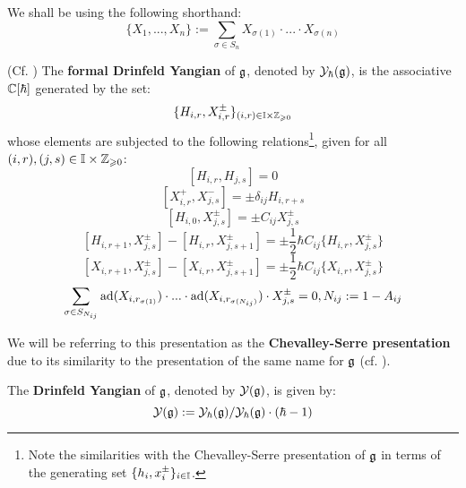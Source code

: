         \begin{convention}
            We shall be using the following shorthand:
                $$\{ X_1, ..., X_n \} := \sum_{\sigma \in S_n} X_{\sigma(1)} \cdot ... \cdot X_{\sigma(n)}$$
        \end{convention}
        \begin{definition} \label{def: formal_drinfeld_yangians}
            (Cf. \cite[Definition 2.1]{guay_nakajima_wendlandt_affine_yangian_coproduct}) The \textbf{formal Drinfeld Yangian} of $\mathfrak{g}$, denoted by $\mathcal{Y}_{\hbar}(\mathfrak{g})$, is the associative $\mathbb{C}[\hbar]$ generated by the set:
                $$\{ H_{i, r}, X_{i, r}^{\pm} \}_{(i, r) \in \simpleroots \x \Z_{\geq 0}}$$
            whose elements are subjected to the following relations\footnote{Note the similarities with the Chevalley-Serre presentation of $\mathfrak{g}$ in terms of the generating set $\{ h_i, x_i^{\pm} \}_{i \in \mathbb{I}}$.}, given for all $(i, r), (j, s) \in \simpleroots \x \Z_{\geq 0}$:
                $$[ H_{i, r}, H_{j, s} ] = 0$$
                $$[ X_{i, r}^+, X_{j, s}^- ] = \pm \delta_{ij} H_{i, r + s}$$
                $$[ H_{i, 0}, X_{j, s}^{\pm} ] = \pm C_{ij} X_{j, s}^{\pm}$$
                $$[ H_{i, r + 1}, X_{j, s}^{\pm} ] - [ H_{i, r}, X_{j, s + 1}^{\pm} ] = \pm \frac12 \hbar C_{ij} \{H_{i, r}, X_{j, s}^{\pm}\}$$
                $$[ X_{i, r + 1}, X_{j, s}^{\pm} ] - [ X_{i, r}, X_{j, s + 1}^{\pm} ] = \pm \frac12 \hbar C_{ij} \{X_{i, r}, X_{j, s}^{\pm}\}$$
                $$\sum_{\sigma \in S_{N_{ij}}} \mathrm{ad}(X_{i, r_{\sigma(1)}}) \cdot ... \cdot \mathrm{ad}(X_{i, r_{\sigma(N_{ij})}}) \cdot X_{j, s}^{\pm} = 0, N_{ij} := 1 - A_{ij}$$
                
            We will be referring to this presentation as the \textbf{Chevalley-Serre presentation} due to its similarity to the presentation of the same name for $\mathfrak{g}$ (cf. \cite[Section 8]{humphreys_lie_algebras}). 
        \end{definition}
        \begin{definition} \label{def: drinfeld_yangians}
            The \textbf{Drinfeld Yangian} of $\mathfrak{g}$, denoted by $\mathcal{Y}(\mathfrak{g})$, is given by:
                $$\mathcal{Y}(\mathfrak{g}) := \mathcal{Y}_{\hbar}(\mathfrak{g})/\mathcal{Y}_{\hbar}(\mathfrak{g}) \cdot (\hbar - 1)$$
        \end{definition}
